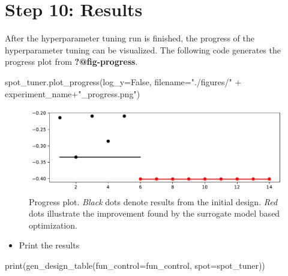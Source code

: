 \documentclass[
  letterpaper,
  DIV=11,
  numbers=noendperiod]{scrreprt}
\newenvironment{Shaded}{\begin{snugshade}}{\end{snugshade}}
\newcommand{\BuiltInTok}[1]{\textcolor[rgb]{0.00,0.23,0.31}{#1}}
\newcommand{\NormalTok}[1]{\textcolor[rgb]{0.00,0.23,0.31}{#1}}
\newcommand{\OperatorTok}[1]{\textcolor[rgb]{0.37,0.37,0.37}{#1}}
\newcommand{\StringTok}[1]{\textcolor[rgb]{0.13,0.47,0.30}{#1}}
\newcommand{\VariableTok}[1]{\textcolor[rgb]{0.07,0.07,0.07}{#1}}
\providecommand{\tightlist}{%
  \setlength{\itemsep}{0pt}\setlength{\parskip}{0pt}}\usepackage{longtable,booktabs,array}
\begin{document}
\hypertarget{sec-results-tuning-17}{%
\section{Step 10: Results}\label{sec-results-tuning-17}}

After the hyperparameter tuning run is finished, the progress of the
hyperparameter tuning can be visualized. The following code generates
the progress plot from \textbf{?@fig-progress}.

\begin{Shaded}
\begin{Highlighting}[]
\NormalTok{spot\_tuner.plot\_progress(log\_y}\OperatorTok{=}\VariableTok{False}\NormalTok{,}
\NormalTok{    filename}\OperatorTok{=}\StringTok{"./figures/"} \OperatorTok{+}\NormalTok{ experiment\_name}\OperatorTok{+}\StringTok{"\_progress.png"}\NormalTok{)}
\end{Highlighting}
\end{Shaded}

\begin{figure}[H]

{\centering \includegraphics{17_spot_hpt_sklearn_multiclass_classification_xgb_files/figure-pdf/cell-26-output-1.pdf}

}

\caption{Progress plot. \emph{Black} dots denote results from the
initial design. \emph{Red} dots illustrate the improvement found by the
surrogate model based optimization.}

\end{figure}

\begin{itemize}
\tightlist
\item
  Print the results
\end{itemize}

\begin{Shaded}
\begin{Highlighting}[]
\BuiltInTok{print}\NormalTok{(gen\_design\_table(fun\_control}\OperatorTok{=}\NormalTok{fun\_control,}
\NormalTok{    spot}\OperatorTok{=}\NormalTok{spot\_tuner))}
\end{Highlighting}
\end{Shaded}
\end{document}
